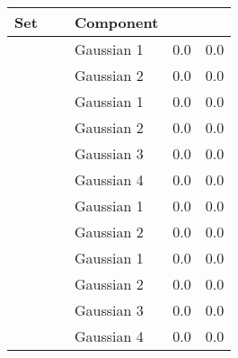 
\begin{tabular}{@{}ccl*{2}{S[scientific-notation=true,round-mode=places,round-precision=1]}}
\toprule
Set 			&~					& Component		& {\mbe} 	& {\sambe}\\
\midrule
\hline
\ferdosiTwo 	&	& Gaussian 1	& 0.0 & 0.0\\
~ 				&	& Gaussian 2	& 0.0 & 0.0\\
\hline
\ferdosiThree	&	& Gaussian 1	& 0.0 & 0.0\\
~ 				&	& Gaussian 2	& 0.0 & 0.0\\
~ 				&	& Gaussian 3	& 0.0 & 0.0\\
~ 				&	& Gaussian 4	& 0.0 & 0.0\\
\hline
\baakmanTwo		&	& Gaussian 1	& 0.0 & 0.0\\
~ 				&	& Gaussian 2	& 0.0 & 0.0\\
\hline
\baakmanThree	&	& Gaussian 1 	& 0.0 & 0.0 \\
~ 				&	& Gaussian 2 	& 0.0 & 0.0 \\
~ 				&	& Gaussian 3 	& 0.0 & 0.0 \\
~ 				&	& Gaussian 4 	& 0.0 & 0.0 \\
\bottomrule
\end{tabular}